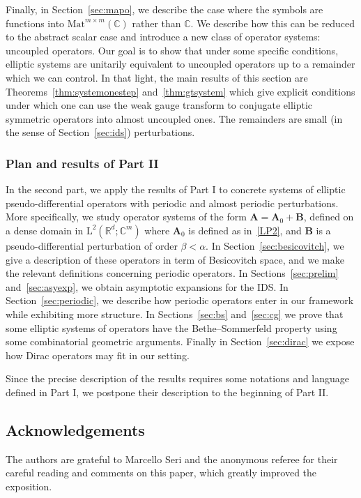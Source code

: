 \documentclass[10pt]{amsart}
\theoremstyle{definition}\newtheorem{defi}[theo]{Definition}\newtheorem{rema}[theo]{Remark}\newtheorem{exam}[theo]{Example}\newtheorem{nota}[theo]{Notation}
\newcommand{\Mat}{\mathrm{Mat}}
\newcommand{\RL}{\mathrm{L}}
\newcommand{\R}{\mathbb R}
\newcommand{\C}{\mathbb C}
\newcommand{\BA}{\mathbf A}
\newcommand{\BB}{\mathbf B}
\begin{document}
Finally, in Section~\ref{sec:mapo}, we describe the case where the symbols are functions into $\Mat^{m\times m}(\C)$ rather than $\C$. We describe how this can be reduced to the abstract scalar case and introduce a new class of operator systems: uncoupled operators. Our goal is to show that under some specific conditions, elliptic systems are unitarily equivalent to uncoupled operators up to a remainder which we can control. In that light, the main results of this section are Theorems~\ref{thm:systemonestep} and~\ref{thm:gtsystem} which give explicit conditions under which one can use the weak gauge transform to conjugate elliptic symmetric operators into almost uncoupled ones. The remainders are small (in the sense of Section~\ref{sec:ids}) perturbations.


\subsubsection*{Plan and results of Part II}

In the second part, we apply the results of Part I to concrete systems of elliptic pseudo-differential operators with periodic and almost periodic perturbations. More specifically, we study operator systems of the form $\BA =
\BA_0 + \BB$, defined on a dense domain in $\RL^2(\R^d;\C^m)$ where $\BA_0$ is defined as in~\eqref{LP2}, and $\BB$ is a pseudo-differential perturbation of order $\beta < \alpha$. In Section~\ref{sec:besicovitch}, we give a description of these operators in term of Besicovitch space, and we make the relevant definitions concerning periodic operators. In Sections~\ref{sec:prelim} and~\ref{sec:asyexp}, we obtain asymptotic expansions for the IDS. In Section~\ref{sec:periodic}, we describe how periodic operators enter in our framework while exhibiting more structure. In Sections~\ref{sec:bs} and~\ref{sec:cg} we prove that some elliptic systems of operators have the Bethe--Sommerfeld property using some combinatorial geometric arguments. Finally in Section~\ref{sec:dirac} we expose how Dirac operators may fit in our setting.

Since the precise description of the results requires some notations and language defined in Part I, we postpone their description to the beginning of Part II.

\subsection*{Acknowledgements}
The authors are grateful to Marcello Seri and the anonymous referee for their careful reading and comments on this paper, which greatly improved the exposition. 
\end{document}
